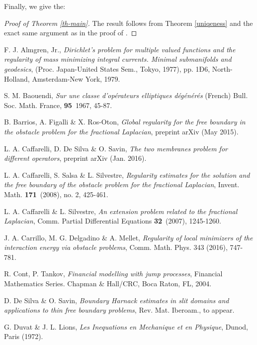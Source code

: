 \documentclass[11pt]{amsart}
\theoremstyle{plain}
\numberwithin{equation}{section}
\begin{document}
Finally, we give the:

\begin{proof}[Proof of Theorem \ref{th-main}]
The result follows from Theorem \ref{uniqeness} and the exact same argument as in the proof of \cite[Theorem 2.6.5]{GP}.
\end{proof}

\begin{thebibliography}{99}

F. J. Almgren, Jr., \emph{Dirichlet's problem for multiple valued functions and the regularity of mass minimizing integral currents. Minimal submanifolds and geodesics}, (Proc. Japan-United States Sem., Tokyo, 1977), pp. 1Ð6, North-Holland, Amsterdam-New York, 1979.

S. M. Baouendi, \emph{Sur une classe d'op\'erateurs elliptiques d\'eg\'en\'er\'es} (French) Bull. Soc. Math. France, \textbf{95}~1967, 45-87.

B. Barrios, A. Figalli \& X. Ros-Oton,  \emph{Global regularity for the free boundary in the obstacle problem for the fractional Laplacian}, preprint arXiv (May 2015).

L. A. Caffarelli, D. De Silva \& O. Savin,  \emph{The two membranes problem for different operators}, preprint arXiv (Jan. 2016).

L. A. Caffarelli, S. Salsa \& L. Silvestre,  \emph{Regularity estimates for the solution and the free boundary of the obstacle problem for the fractional Laplacian}, Invent. Math. \textbf{171}~(2008), no. 2, 425-461.

L. A. Caffarelli \& L. Silvestre, \emph{An extension problem related to the fractional Laplacian}, Comm. Partial Differential Equations \textbf{32}~(2007), 1245-1260.

J. A. Carrillo, M. G. Delgadino \& A. Mellet, \emph{Regularity of local minimizers of the interaction energy via obstacle problems}, Comm. Math. Phys. 343 (2016), 747-781.

R. Cont, P. Tankov, \emph{Financial modelling with jump processes}, Financial Mathematics Series. Chapman \& Hall/CRC, Boca Raton, FL, 2004.

D. De Silva \& O. Savin, \emph{Boundary Harnack estimates in slit domains and applications to thin free boundary
problems}, Rev. Mat. Iberoam., to appear.

G. Duvat \& J. L. Lions, \emph{Les Inequations en Mechanique et en Physique}, Dunod, Paris (1972).


\end{thebibliography}
\end{document}
